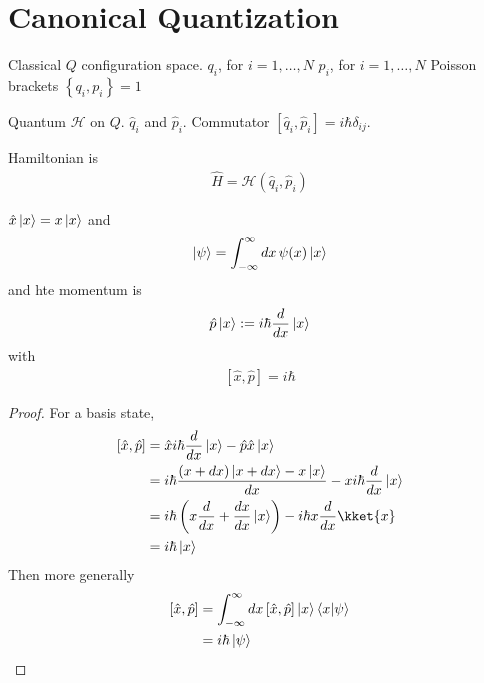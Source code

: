 \section{Canonical Quantization}

Classical $Q$ configuration space.
$q_i$, for $i=1,\ldots,N$
$p_i$, for $i=1,\ldots,N$
Poisson brackets
$\left\{ q_i, p_i \right\}=1$

Quantum $\mathcal{H}$ on $Q$.
$\hat{q}_i$ and $\hat{p}_i$.
Commutator
$\left[ \hat{q}_i, \hat{p}_i \right] = i\hbar \delta_{ij}$.

Hamiltonian is
\begin{align}
    \hat{H} = \mathcal{H}\left( \hat{q}_i, \hat{p}_i \right)
\end{align}

\begin{example}[1D particle]
    $\hat{x}\ket{x} = x\ket{x}$
    and
    \begin{align}
        \ket{\psi} = \int_{-\infty}^{\infty} dx\,
        \psi(x)\ket{x}
    \end{align}
    and hte momentum is
    \begin{align}
        \hat{p}\ket{x} := i\hbar \frac{d}{dx}\ket{x}
    \end{align}
    with
    \begin{align}
        \left[ \hat{x}, \hat{p} \right] = i\hbar
    \end{align}
\end{example}
\begin{proof}
    For a basis state,
    \begin{align}
        \left[ \hat{x}, \hat{p} \right]
        &=
        \hat{x} i\hbar \frac{d}{dx}\ket{x}
        - \hat{p}\hat{x}\ket{x}\\
        &=
        i\hbar
        \frac{(x + dx)\ket{x + dx} - x\ket{x}}{dx}
        - x i\hbar \frac{d}{dx}\ket{x}\\
        &=
        i\hbar\left(
            x \frac{d}{dx} + \frac{dx}{dx}\ket{x}
        \right)
        - i\hbar x \frac{d}{dx}\kket{x}\\
        &= i\hbar \ket{x}
    \end{align}
    Then more generally
    \begin{align}
        \left[ \hat{x}, \hat{p} \right] &=
        \int_{-\infty}^{\infty} dx \left[ \hat{x}, \hat{p} \right]
        \ket{x} \braket{x}{\psi}\\
        &= i\hbar\ket{\psi}
    \end{align}
\end{proof}

